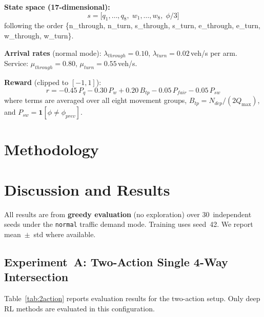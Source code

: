 \documentclass[conference]{IEEEtran}
\begin{document}
\noindent\textbf{State space (17-dimensional):}
\begin{equation}
  s = \bigl[q_1,\ldots,q_8,\;w_1,\ldots,w_8,\;\phi/3\bigr]
\end{equation}
following the order \{n\_through, n\_turn, s\_through, s\_turn,
e\_through, e\_turn, w\_through, w\_turn\}.

\noindent\textbf{Arrival rates} (normal mode):
$\lambda_{through}{=}0.10$, $\lambda_{turn}{=}0.02$\,veh/s per arm.
Service: $\mu_{through}{=}0.80$, $\mu_{turn}{=}0.55$\,veh/s.

\noindent\textbf{Reward} (clipped to $[-1,1]$):
\begin{equation}
  r = -0.45\,P_q -0.30\,P_w +0.20\,B_{tp}
      -0.05\,P_{fair} -0.05\,P_{sw}
\end{equation}
where terms are averaged over all eight movement groups,
$B_{tp}{=}N_{dep}/(2Q_{\max})$, and
$P_{sw}{=}\mathbf{1}[\phi \neq \phi_{prev}]$.

\section{Methodology}


\section{Discussion and Results}

All results are from \textbf{greedy evaluation} (no exploration)
over 30~independent seeds under the \texttt{normal} traffic demand
mode. Training uses seed~42. We report mean~$\pm$~std where
available.

\subsection{Experiment~A: Two-Action Single 4-Way Intersection}

Table~\ref{tab:2action} reports evaluation results for the two-action
setup. Only deep RL methods are evaluated in this configuration.
\end{document}
